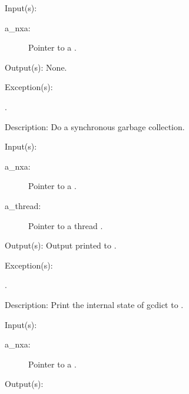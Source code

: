 \begin{capi}
\begin{capilist}
	\item[Input(s): ]
		\begin{description}\item[]
		\item[a\_nxa: ]
			Pointer to a .
		\end{description}
	\item[Output(s): ] None.
	\item[Exception(s): ]
		\begin{description}\item[]
		\item[.]
		\end{description}
	\item[Description: ]
		Do a synchronous garbage collection.
	\end{capilist}
\label{nxa_dump}
	\begin{capilist}
	\item[Input(s): ]
		\begin{description}\item[]
		\item[a\_nxa: ]
			Pointer to a .
		\item[a\_thread: ]
			Pointer to a thread .
		\end{description}
	\item[Output(s): ]
		Output printed to .
	\item[Exception(s): ]
		\begin{description}\item[]
		\item[.]
		\end{description}
	\item[Description: ]
		Print the internal state of gcdict to .
	\end{capilist}
\label{nxa_active_get}
	\begin{capilist}
	\item[Input(s): ]
		\begin{description}\item[]
		\item[a\_nxa: ]
			Pointer to a \classname{nxa}.
		\end{description}
	\item[Output(s): ]

\end{capilist}
\end{capi}
